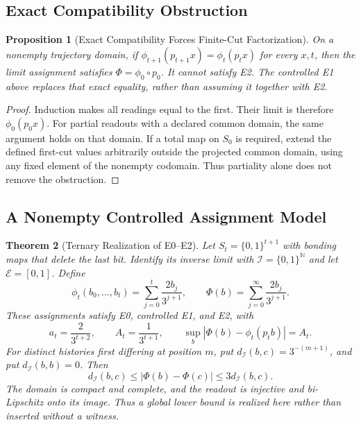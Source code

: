 \documentclass[11pt,a4paper]{article}
\theoremstyle{plain}
\newtheorem{theorem}{Theorem}[section]
\newtheorem{proposition}[theorem]{Proposition}
\theoremstyle{definition}
\theoremstyle{remark}
\begin{document}
\subsection{Exact Compatibility Obstruction}

\begin{proposition}[Exact Compatibility Forces Finite-Cut Factorization]\label{prop:exact-e1-obstruction}
On a nonempty trajectory domain, if $\phi_{t+1}(p_{t+1}x)=\phi_t(p_tx)$ for every $x,t$, then the limit assignment satisfies $\Phi=\phi_0\circ p_0$. It cannot satisfy E2. The controlled E1 above replaces that exact equality, rather than assuming it together with E2.
\end{proposition}

\begin{proof}
Induction makes all readings equal to the first. Their limit is therefore $\phi_0(p_0x)$. For partial readouts with a declared common domain, the same argument holds on that domain. If a total map on $S_0$ is required, extend the defined first-cut values arbitrarily outside the projected common domain, using any fixed element of the nonempty codomain. Thus partiality alone does not remove the obstruction.
\end{proof}

\subsection{A Nonempty Controlled Assignment Model}

\begin{theorem}[Ternary Realization of E0--E2]\label{thm:ternary-regime-realization}
Let $S_t=\{0,1\}^{t+1}$ with bonding maps that delete the last bit. Identify its inverse limit with $\mathcal I=\{0,1\}^{\mathbb N}$ and let $\mathcal E=[0,1]$. Define
\[
\phi_t(b_0,\ldots,b_t)=\sum_{j=0}^t\frac{2b_j}{3^{j+1}},
\qquad
\Phi(b)=\sum_{j=0}^{\infty}\frac{2b_j}{3^{j+1}}.
\]
These assignments satisfy E0, controlled E1, and E2, with
\[
a_t=\frac{2}{3^{t+2}},\qquad
A_t=\frac{1}{3^{t+1}},\qquad
\sup_b|\Phi(b)-\phi_t(p_tb)|=A_t.
\]
For distinct histories first differing at position $m$, put $d_{\mathcal I}(b,c)=3^{-(m+1)}$, and put $d_{\mathcal I}(b,b)=0$. Then
\[
d_{\mathcal I}(b,c)\leq|\Phi(b)-\Phi(c)|\leq3d_{\mathcal I}(b,c).
\]
The domain is compact and complete, and the readout is injective and bi-Lipschitz onto its image. Thus a global lower bound is realized here rather than inserted without a witness.
\end{theorem}
\end{document}

